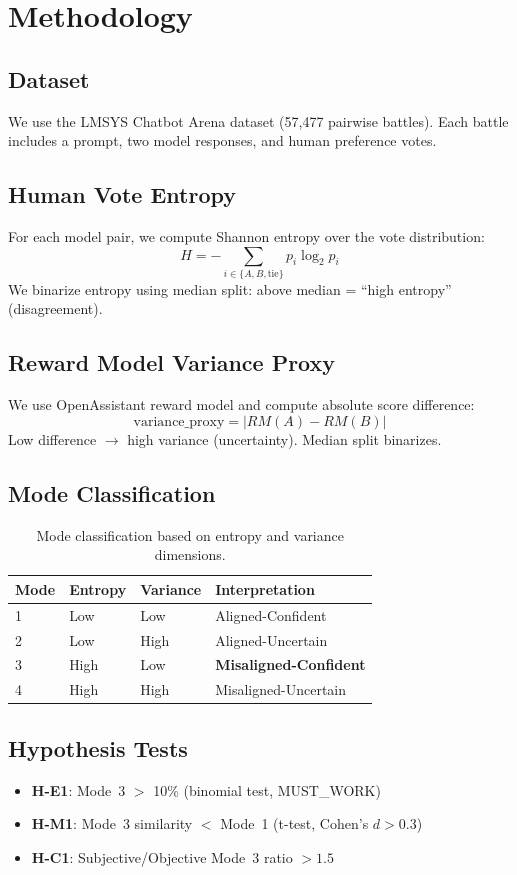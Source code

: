 \section{Methodology}

\subsection{Dataset}

We use the LMSYS Chatbot Arena dataset \cite{zheng2024judging} (57,477 pairwise battles). Each battle includes a prompt, two model responses, and human preference votes.

\subsection{Human Vote Entropy}

For each model pair, we compute Shannon entropy over the vote distribution:
\begin{equation}
H = -\sum_{i \in \{A, B, \text{tie}\}} p_i \log_2 p_i
\end{equation}
We binarize entropy using median split: above median = ``high entropy'' (disagreement).

\subsection{Reward Model Variance Proxy}

We use OpenAssistant reward model and compute absolute score difference:
\begin{equation}
\text{variance\_proxy} = |RM(A) - RM(B)|
\end{equation}
Low difference $\rightarrow$ high variance (uncertainty). Median split binarizes.

\subsection{Mode Classification}

\begin{table}[h]
\centering
\caption{Mode classification based on entropy and variance dimensions.}
\label{tab:mode_classification}
\begin{tabular}{@{}llll@{}}
\toprule
Mode & Entropy & Variance & Interpretation \\
\midrule
1 & Low & Low & Aligned-Confident \\
2 & Low & High & Aligned-Uncertain \\
3 & High & Low & \textbf{Misaligned-Confident} \\
4 & High & High & Misaligned-Uncertain \\
\bottomrule
\end{tabular}
\end{table}

\subsection{Hypothesis Tests}

\begin{itemize}
    \item \textbf{H-E1}: Mode~3 $>$ 10\% (binomial test, MUST\_WORK)
    \item \textbf{H-M1}: Mode~3 similarity $<$ Mode~1 (t-test, Cohen's $d > 0.3$)
    \item \textbf{H-C1}: Subjective/Objective Mode~3 ratio $> 1.5$
\end{itemize}
